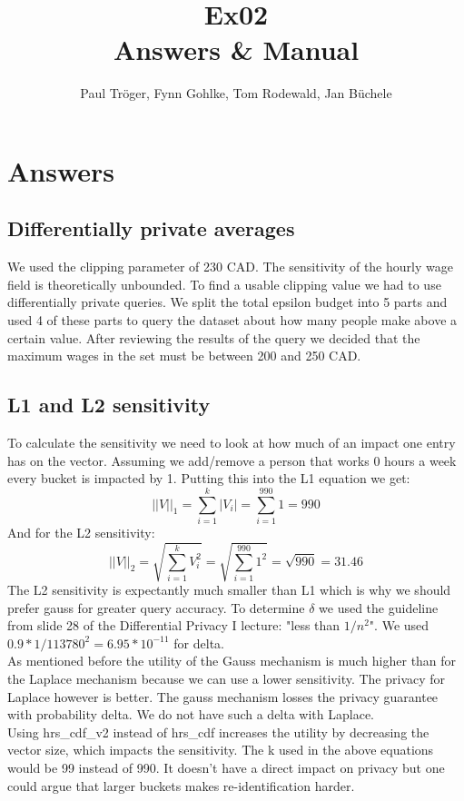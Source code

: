 \documentclass{article}
\begin{document}
	
	\title{Ex02 \\ Answers \& Manual}
	\author{Paul Tr\"oger, Fynn Gohlke, Tom Rodewald, Jan B\"uchele}
	
	\maketitle
	
	\section{Answers}
		\subsection{Differentially private averages}
			We used the clipping parameter of 230 CAD. The sensitivity of the hourly wage field is theoretically unbounded. To find a usable clipping value we had to use differentially private queries. We split the total epsilon budget into 5 parts and used 4 of these parts to query the dataset about how many people make above a certain value. After reviewing the results of the query we decided that the maximum wages in the set must be between 200 and 250 CAD.
		\subsection{L1 and L2 sensitivity}
		To calculate the sensitivity we need to look at how much of an impact one entry has on the vector.
		Assuming we add/remove a person that works 0 hours a week every bucket is impacted by 1.
		Putting this into the L1 equation we get:
		\begin{equation*}
			||V||_1 = \sum_{i=1}^{k} |V_i| =  \sum_{i=1}^{990} 1 = 990
		\end{equation*}
		And for the L2 sensitivity:
		\begin{equation*}
			||V||_2 = \sqrt{\sum_{i=1}^{k} V^2_i }=  \sqrt{\sum_{i=1}^{990} 1^2} = \sqrt{990} = 31.46
		\end{equation*}
		The L2 sensitivity is expectantly much smaller than L1 which is why we should prefer gauss for greater query accuracy.
		To determine $\delta$ we used the guideline from slide 28 of the Differential Privacy I lecture: "less than $1/n^2$".
		We used $0.9 * 1/113780^2 = 6.95 * 10^{-11}$ for delta.\\
		As mentioned before the utility of the Gauss mechanism is much higher than for the Laplace mechanism because we can use a lower sensitivity.
		The privacy for Laplace however is better. The gauss mechanism losses the privacy guarantee with probability delta. We do not have such a delta with Laplace.\\
		Using hrs\_cdf\_v2 instead of hrs\_cdf increases the utility by decreasing the vector size, which impacts the sensitivity. The k used in the above equations would be 99 instead of 990. It doesn't have a direct impact on privacy but one could argue that larger buckets makes re-identification harder.
\end{document}

